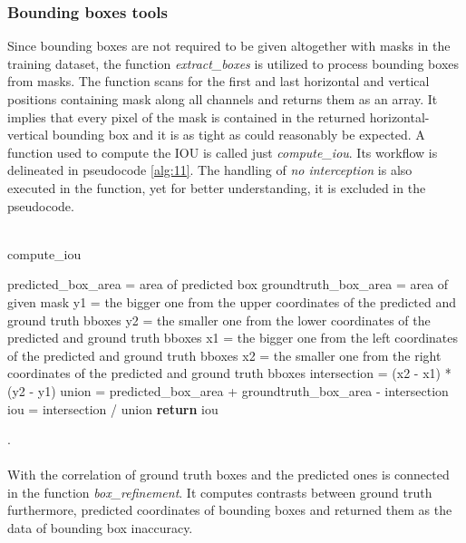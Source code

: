 \subsubsection{Bounding boxes tools} 
Since bounding boxes are not required to be given altogether with masks in the training dataset, the function \textit{extract\_boxes} is utilized to process bounding boxes from masks. The function scans for the first and last horizontal and vertical 
positions containing mask along all channels and returns them as an array. It implies that every pixel of the mask is contained in the returned horizontal-vertical bounding box and it is as tight as could reasonably be expected. 
A function used to compute the IOU is called just \textit{compute\_iou}. Its workflow is delineated in pseudocode \ref{alg:11}. The handling of \textit{no interception} is also executed in the function, yet for better understanding, it is excluded in the pseudocode. 
\\
\\
\begin{algorithm}[H] \label{alg:11}
  \caption{compute\_iou}
  \SetAlgoLined
  \DontPrintSemicolon
   predicted\_box\_area = area of predicted box\;
groundtruth\_box\_area = area of given mask\;
y1 = the bigger one from the upper coordinates of the predicted and ground truth bboxes\;
 y2 = the smaller one from the lower coordinates of the predicted and ground truth bboxes\;
x1 = the bigger one from the left coordinates of the predicted and ground truth bboxes\;
x2 = the smaller one from the right coordinates of the predicted and ground truth bboxes\; 
intersection = (x2 - x1) * (y2 - y1)\;
union = predicted\_box\_area + groundtruth\_box\_area - intersection\;
iou = intersection / union\;
\textbf{return} iou
\end{algorithm}
.\\
\\
With the correlation of ground truth boxes and the predicted ones is connected in the function \textit{box\_refinement}. It computes contrasts between ground truth furthermore, predicted coordinates of bounding boxes and returned them as the data of bounding box inaccuracy. 
\\

